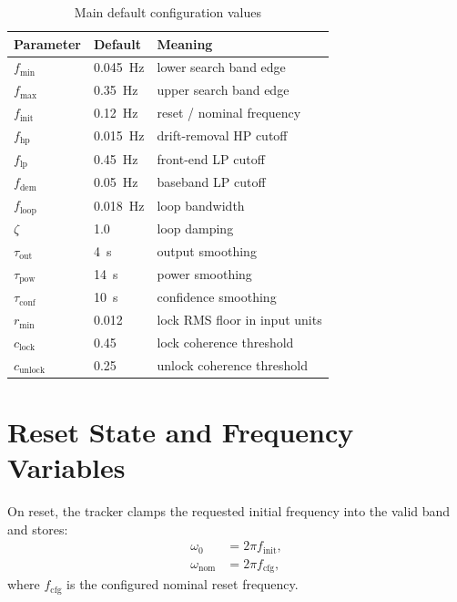 \documentclass[conference]{IEEEtran}
\begin{document}
\begin{table}[t]
  \centering
  \caption{Main default configuration values}
  \label{tab:defaults}
  \small
  \begin{tabular}{@{}lll@{}}
    \toprule
    Parameter & Default & Meaning \\
    \midrule
    \(f_{\min}\) & \SI{0.045}{Hz} & lower search band edge \\
    \(f_{\max}\) & \SI{0.35}{Hz} & upper search band edge \\
    \(f_{\mathrm{init}}\) & \SI{0.12}{Hz} & reset / nominal frequency \\
    \(f_{\mathrm{hp}}\) & \SI{0.015}{Hz} & drift-removal HP cutoff \\
    \(f_{\mathrm{lp}}\) & \SI{0.45}{Hz} & front-end LP cutoff \\
    \(f_{\mathrm{dem}}\) & \SI{0.05}{Hz} & baseband LP cutoff \\
    \(f_{\mathrm{loop}}\) & \SI{0.018}{Hz} & loop bandwidth \\
    \(\zeta\) & 1.0 & loop damping \\
    \(\tau_{\mathrm{out}}\) & \SI{4}{s} & output smoothing \\
    \(\tau_{\mathrm{pow}}\) & \SI{14}{s} & power smoothing \\
    \(\tau_{\mathrm{conf}}\) & \SI{10}{s} & confidence smoothing \\
    \(r_{\min}\) & 0.012 & lock RMS floor in input units \\
    \(c_{\mathrm{lock}}\) & 0.45 & lock coherence threshold \\
    \(c_{\mathrm{unlock}}\) & 0.25 & unlock coherence threshold \\
    \bottomrule
  \end{tabular}
\end{table}

\section{Reset State and Frequency Variables}

On reset, the tracker clamps the requested initial frequency into the valid
band and stores:
\begin{align}
  \omega_0 &= 2\pi f_{\mathrm{init}},\\
  \omega_{\mathrm{nom}} &= 2\pi f_{\mathrm{cfg}},
\end{align}
where \(f_{\mathrm{cfg}}\) is the configured nominal reset frequency.
\end{document}

